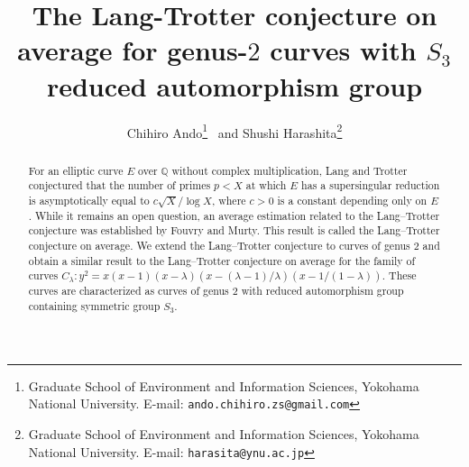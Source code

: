 \documentclass[a4paper, 11pt]{article}
\title{The Lang-Trotter conjecture on average for genus-$2$ curves with $S_3$ reduced automorphism group }
\author{Chihiro Ando\thanks{Graduate School of Environment and Information Sciences, Yokohama National University.
E-mail: \texttt{ando.chihiro.zs@gmail.com} } \  and Shushi Harashita\thanks{Graduate School of Environment and Information Sciences, Yokohama National University.
E-mail: \texttt{harasita@ynu.ac.jp}}}
\date{}
\theoremstyle{plain}
\newcommand{\?}{\textcolor{red}{??}}
\begin{document}
\maketitle


\begin{abstract}
    \noindent 
    For an elliptic curve $E$ over $\mathbb{Q}$ without complex multiplication, Lang and Trotter conjectured that the number of primes $p <X$ at which $E$ has a supersingular reduction is asymptotically equal to $c\sqrt{X}/\log X$, where $c>0$ is a constant depending only on $E$. While it remains an open question, an average estimation related to the Lang--Trotter conjecture was established by Fouvry and Murty. This result is called the Lang--Trotter conjecture on average. We extend the Lang--Trotter conjecture to curves of genus $2$ and obtain a similar result to the Lang--Trotter conjecture on average for the family of curves $C_{\lambda}:y^2=x(x-1)(x-{\lambda})(x-(\lambda-1)/{\lambda})(x-1/ (1-\lambda))$. These curves are characterized as curves of genus $2$ with reduced automorphism group containing symmetric group $S_3$. 
    
\end{abstract}
\end{document}
